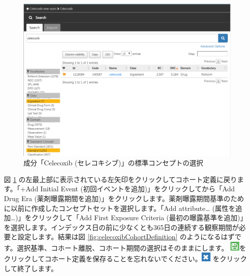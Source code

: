 \documentclass[
  11pt]{book}
\theoremstyle{definition}
\theoremstyle{definition}
\theoremstyle{definition}
\theoremstyle{definition}
\theoremstyle{remark}
\begin{document}
\begin{figure}

{\centering \includegraphics[width=1\linewidth]{images/SuggestedAnswers/conceptSearchAtlas} 

}

\caption{成分「Celecoxib (セレコキシブ)」の標準コンセプトの選択}\label{fig:conceptSearchAtlas}
\end{figure}

図 \ref{fig:conceptSearchAtlas} の左最上部に表示されている左矢印をクリックしてコホート定義に戻ります。「+Add Initial Event (初回イベントを追加)」をクリックしてから「Add Drug Era (薬剤曝露期間を追加)」をクリックします。薬剤曝露期間基準のために以前に作成したコンセプトセットを選択します。「Add attribute\ldots{} (属性を追加\ldots)」をクリックして「Add First Exposure Criteria (最初の曝露基準を追加)」を選択します。インデックス日の前に少なくとも365日の連続する観察期間が必要と設定します。結果は図 \ref{fig:celecoxibCohortDefinition} のようになるはずです。選択基準、コホート離脱、コホート期間の選択はそのままにします。 \includegraphics{images/Cohorts/save.png}をクリックしてコホート定義を保存ることを忘れないでください。\includegraphics{images/SuggestedAnswers/close.png} をクリックして終了します。
\end{document}
